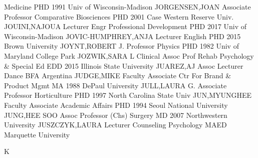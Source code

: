 \documentclass[
]{article}
\begin{document}
 \textbar Medicine \textbar PHD 1991 Univ of
Wisconsin-Madison \textbar JORGENSEN,JOAN \textbar Associate Professor
\textbar{}  \textbar Comparative Biosciences \textbar PHD
2001 Case Western Reserve Univ. \textbar JOUINI,NAJOUA \textbar Lecturer
\textbar{}  \textbar Engr Professional Development
\textbar PHD 2017 Univ of Wisconsin-Madison \textbar JOVIC-HUMPHREY,ANJA
\textbar Lecturer \textbar{}  \textbar English \textbar PHD
2015 Brown University \textbar JOYNT,ROBERT J. \textbar Professor
\textbar{}  \textbar Physics \textbar PHD 1982 Univ of
Maryland College Park \textbar JOZWIK,SARA L \textbar Clinical Assoc
Prof \textbar{}  \textbar Rehab Psychology \& Special Ed
\textbar EDD 2015 Illinois State University \textbar JUAREZ,AJ
\textbar Assoc Lecturer \textbar{}  \textbar Dance
\textbar BFA Argentina \textbar JUDGE,MIKE \textbar Faculty Associate
\textbar{}  \textbar Ctr For Brand \& Product Mgmt
\textbar MA 1988 DePaul University \textbar JULL,LAURA G.
\textbar Associate Professor \textbar{} 
\textbar Horticulture \textbar PHD 1997 North Carolina State Univ
\textbar JUN,MYUNGHEE \textbar Faculty Associate \textbar{} 
\textbar Academic Affairs \textbar PHD 1994 Seoul National University
\textbar JUNG,HEE SOO \textbar Assoc Professor (Chs) \textbar{}
 \textbar Surgery \textbar MD 2007 Northwestern University
\textbar JUSZCZYK,LAURA \textbar Lecturer \textbar{} 
\textbar Counseling Psychology \textbar MAED Marquette University
\textbar{}

K

\textbar{}
\end{document}
